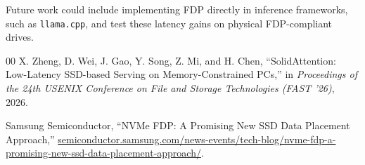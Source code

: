\documentclass[conference]{IEEEtran}
\begin{document}
    Future work could include implementing FDP directly in inference frameworks, such as \texttt{llama.cpp}, and test these latency gains on physical FDP-compliant drives.

\begin{thebibliography}{00}
        X. Zheng, D. Wei, J. Gao, Y. Song, Z. Mi, and H. Chen, ``SolidAttention: Low-Latency SSD-based Serving on Memory-Constrained PCs,'' in \textit{Proceedings of the 24th USENIX Conference on File and Storage Technologies (FAST '26)}, 2026.

        Samsung Semiconductor, ``NVMe FDP: A Promising New SSD Data Placement Approach,'' \url{semiconductor.samsung.com/news-events/tech-blog/nvme-fdp-a-promising-new-ssd-data-placement-approach/}.
\end{thebibliography}
\end{document}

